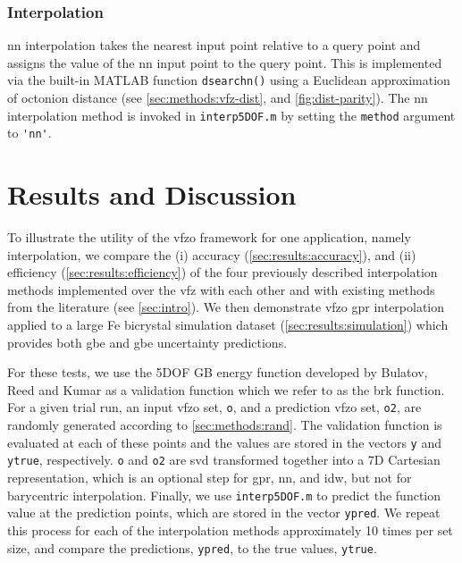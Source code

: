\documentclass[final,twocolumn,12pt]{elsarticle}
\newcommand{\matlab}[1]{\mbox{\lstinline[style=Matlab-editor]{#1}}}
\newcommand{\inpt}{input}
\newcommand{\outpt}{prediction}
\begin{document}
\subsubsection{ Interpolation}
\label{sec:methods:interp:nn}


\Gls{nn} interpolation takes the nearest \inpt{} point relative to a query point and assigns the value of the \gls{nn} \inpt{} point to the query point. This is implemented via the built-in MATLAB function \matlab{dsearchn()} using a Euclidean approximation of octonion distance (see \cref{sec:methods:vfz-dist}, and \cref{fig:dist-parity}). The \gls{nn} interpolation method is invoked in \matlab{interp5DOF.m} by setting the \matlab{method} argument to \matlab{'nn'}.

\section{Results and Discussion} \label{sec:results}

To illustrate the utility of the \gls{vfzo} framework for one application, namely interpolation, we compare the (i) accuracy (\cref{sec:results:accuracy}), and (ii) efficiency (\cref{sec:results:efficiency}) of the four previously described interpolation methods implemented over the \gls{vfz} with each other and with existing methods from the literature (see \cref{sec:intro}). We then demonstrate \gls{vfzo} \gls{gpr} interpolation applied to a large Fe bicrystal simulation dataset \cite{kimPhasefieldModeling3D2014} (\cref{sec:results:simulation}) which provides both \gls{gbe} and \gls{gbe} uncertainty predictions.

For these tests, we use the 5DOF GB energy function developed by Bulatov, Reed and Kumar \cite{bulatovGrainBoundaryEnergy2014} as a validation function which we refer to as the \gls{brk} function. For a given trial run, an \inpt{} \gls{vfzo} set, \matlab{o}, and a \outpt{} \gls{vfzo} set, \matlab{o2}, are randomly generated according to \cref{sec:methods:rand}. The validation function is evaluated at each of these points and the values are stored in the vectors \matlab{y} and \matlab{ytrue}, respectively. \matlab{o} and \matlab{o2} are \gls{svd} transformed together into a 7D Cartesian representation, which is an optional step for \gls{gpr}, \gls{nn}, and \gls{idw}, but not for barycentric interpolation. Finally, we use \matlab{interp5DOF.m} \cite{bairdFiveDegreeofFreedom5DOF2020} to predict the function value at the \outpt{} points, which are stored in the vector \matlab{ypred}. We repeat this process for each of the interpolation methods approximately 10 times per set size, and compare the predictions, \matlab{ypred}, to the true values, \matlab{ytrue}.
\end{document}
